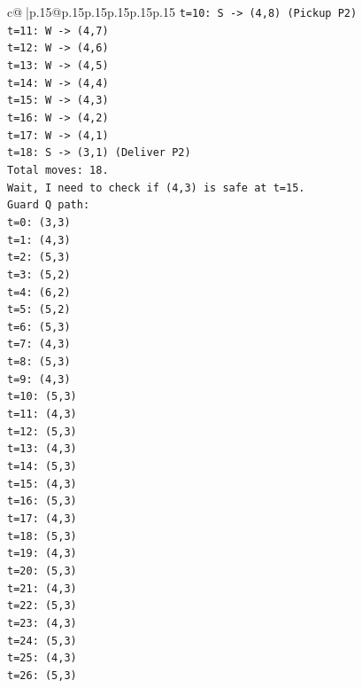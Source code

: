 \documentclass{article}
\begin{document}
{\begin{supertabular}{c@{$\;$}|p{.15\linewidth}@{}p{.15\linewidth}p{.15\linewidth}p{.15\linewidth}p{.15\linewidth}p{.15\linewidth}}
{{{\texttt{t=10: S {-}> (4,8) (Pickup P2)} \\
\texttt{t=11: W {-}> (4,7)} \\
\texttt{t=12: W {-}> (4,6)} \\
\texttt{t=13: W {-}> (4,5)} \\
\texttt{t=14: W {-}> (4,4)} \\
\texttt{t=15: W {-}> (4,3)} \\
\texttt{t=16: W {-}> (4,2)} \\
\texttt{t=17: W {-}> (4,1)} \\
\texttt{t=18: S {-}> (3,1) (Deliver P2)} \\
\texttt{Total moves: 18.} \\
\texttt{Wait, I need to check if (4,3) is safe at t=15.} \\
\texttt{Guard Q path:} \\
\texttt{t=0: (3,3)} \\
\texttt{t=1: (4,3)} \\
\texttt{t=2: (5,3)} \\
\texttt{t=3: (5,2)} \\
\texttt{t=4: (6,2)} \\
\texttt{t=5: (5,2)} \\
\texttt{t=6: (5,3)} \\
\texttt{t=7: (4,3)} \\
\texttt{t=8: (5,3)} \\
\texttt{t=9: (4,3)} \\
\texttt{t=10: (5,3)} \\
\texttt{t=11: (4,3)} \\
\texttt{t=12: (5,3)} \\
\texttt{t=13: (4,3)} \\
\texttt{t=14: (5,3)} \\
\texttt{t=15: (4,3)} \\
\texttt{t=16: (5,3)} \\
\texttt{t=17: (4,3)} \\
\texttt{t=18: (5,3)} \\
\texttt{t=19: (4,3)} \\
\texttt{t=20: (5,3)} \\
\texttt{t=21: (4,3)} \\
\texttt{t=22: (5,3)} \\
\texttt{t=23: (4,3)} \\
\texttt{t=24: (5,3)} \\
\texttt{t=25: (4,3)} \\
\texttt{t=26: (5,3)} \\
}}}
\end{supertabular}}
\end{document}
